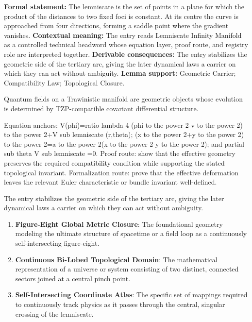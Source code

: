 \begingroup\footnotesize\setlength{\emergencystretch}{3em}\sloppy
\textbf{Formal statement:} The lemniscate is the set of points in a plane for which the product of the distances to two fixed foci is constant. At its centre the curve is approached from four directions, forming a saddle point where the gradient vanishes. \textbf{Contextual meaning:} The entry reads Lemniscate Infinity Manifold as a controlled technical headword whose equation layer, proof route, and registry role are interpreted together. \textbf{Derivable consequences:} The entry stabilizes the geometric side of the tertiary arc, giving the later dynamical laws a carrier on which they can act without ambiguity. \textbf{Lemma support:} Geometric Carrier; Compatibility Law; Topological Closure.\par
\endgroup

Quantum fields on a Trawinistic manifold are geometric objects whose evolution is determined by TZP-compatible covariant differential structure.

Equation anchors: V(phi)=ratio lambda 4 (phi to the power 2-v to the power 2) to the power 2+V sub lemniscate (r,theta); (x to the power 2+y to the power 2) to the power 2=a to the power 2(x to the power 2-y to the power 2); and partial sub theta V sub lemniscate =0. Proof route: show that the effective geometry preserves the required compatibility condition while supporting the stated topological invariant. Formalization route: prove that the effective deformation leaves the relevant Euler characteristic or bundle invariant well-defined.

The entry stabilizes the geometric side of the tertiary arc, giving the later dynamical laws a carrier on which they can act without ambiguity.
\endgroup

\begin{enumerate}[leftmargin=1.6em,itemsep=6pt,topsep=4pt]
\item \textbf{Figure-Eight Global Metric Closure}: The foundational geometry modeling the ultimate structure of spacetime or a field loop as a continuously self-intersecting figure-eight.
\item \textbf{Continuous Bi-Lobed Topological Domain}: The mathematical representation of a universe or system consisting of two distinct, connected sectors joined at a central pinch point.
\item \textbf{Self-Intersecting Coordinate Atlas}: The specific set of mappings required to continuously track physics as it passes through the central, singular crossing of the lemniscate.
\end{enumerate}

